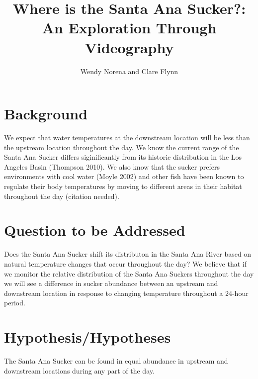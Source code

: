 \documentclass{tufte-handout}
\title{Where is the Santa Ana Sucker?: An Exploration Through Videography}
\author{Wendy Norena and Clare Flynn}
\begin{document}


\maketitle


\section{Background}
We expect that water temperatures at the downstream location will be less than the upstream location throughout the day. We know the current range of the Santa Ana Sucker differs siginificantly from its historic distribution in the Los Angeles Basin (Thompson 2010). We also know that the sucker prefers environments with cool water (Moyle 2002) and other fish have been known to regulate their body temperatures by moving to different areas in their habitat throughout the day (citation needed).
\section{Question to be Addressed}
Does the Santa Ana Sucker shift its distributon in the Santa Ana River based on natural temperature changes that occur throughout the day? We believe that if we monitor the relative distribution of the Santa Ana Suckers throughout the day we will see a difference in sucker abundance between an upstream and downstream location in response to changing temperature throughout a 24-hour period.
\section{Hypothesis/Hypotheses}
The Santa Ana Sucker can be found in equal abundance in upstream and downstream locations during any part of the day.
\end{document}
